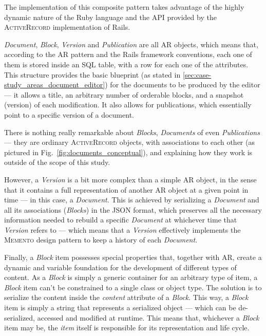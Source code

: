 The implementation of this composite pattern takes advantage of the highly dynamic nature of the Ruby language and the API provided by the \textsc{ActiveRecord} implementation of Rails.

\emph{Document}, \emph{Block}, \emph{Version} and \emph{Publication} are all AR objects, which means that, according to the AR pattern and the Rails framework conventions, each one of them is stored inside an SQL table, with a row for each one of the attributes. This structure provides the basic blueprint (as stated in \ref{sec:case-study_areas_document_editor}) for the documents to be produced by the editor --- it allows a title, an arbitrary number of orderable blocks, and a snapshot (version) of each modification. It also allows for publications, which essentially point to a specific version of a document.

There is nothing really remarkable about \emph{Blocks}, \emph{Documents} of even \emph{Publications} --- they are ordinary \textsc{ActiveRecord} objects, with associations to each other (as pictured in Fig.~\ref{fig:documents_conceptual}), and explaining how they work is outside of the scope of this study.

However, a \emph{Version} is a bit more complex than a simple AR object, in the sense that it contains a full representation of another AR object at a given point in time --- in this case, a \emph{Document}. This is achieved by serializing a \emph{Document} and all its associations (\emph{Blocks}) in the JSON format, which preserves all the necessary information needed to rebuild a specific \emph{Document} at whichever time that \emph{Version} refers to --- which means that a \emph{Version} effectively implements the \textsc{Memento} design pattern to keep a history of each \emph{Document}.

Finally, a \emph{Block} item possesses special properties that, together with AR, create a dynamic and variable foundation for the development of different types of content. As a \emph{Block} is simply a generic container for an arbitrary type of item, a \emph{Block} item can't be constrained to a single class or object type. The solution is to serialize the content inside the \emph{content} attribute of a \emph{Block}. This way, a \emph{Block} item is simply a string that represents a serialized object --- which can be de-serialized, accessed and modified at runtime. This means that, whichever a \emph{Block} item may be, the \emph{item} itself is responsible for its representation and life cycle.

